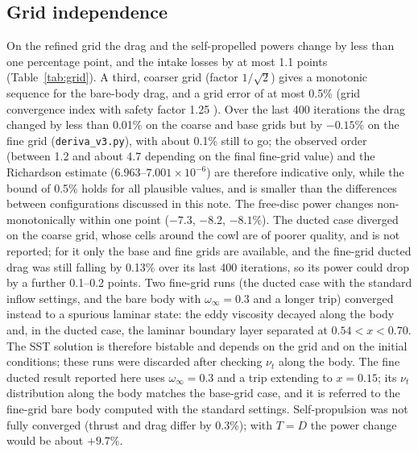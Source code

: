 \documentclass[11pt,a4paper]{article}
\begin{document}
\subsection{Grid independence}\label{sec:grid}
On the refined grid the drag and the self-propelled powers change by less than one
percentage point, and the intake losses by at most 1.1 points (Table~\ref{tab:grid}). A third,
coarser grid (factor $1/\sqrt2$) gives a monotonic sequence for the bare-body drag,
and a grid error of at most 0.5\% (grid convergence index with safety factor 1.25
\cite{celik2008}). Over the last 400 iterations the drag changed by less than
0.01\% on the coarse and base grids but by $-0.15\%$ on the fine grid (\texttt{deriva\_v3.py}),
with about 0.1\% still to go; the observed order (between 1.2 and about 4.7 depending on the
final fine-grid value) and the Richardson estimate ($6.963$--$7.001\times10^{-6}$) are therefore
indicative only, while the bound of 0.5\% holds for all plausible values, and is smaller than
the differences between configurations discussed in this note. The free-disc power changes non-monotonically within one point
($-7.3$, $-8.2$, $-8.1\%$). The ducted case diverged on the coarse grid, whose cells around the
cowl are of poorer quality, and is not reported; for it only the base and fine grids are
available, and the fine-grid ducted drag was still falling by 0.13\% over its last 400
iterations, so its power could drop by a further 0.1--0.2 points. Two fine-grid runs (the ducted case with the standard inflow
settings, and the bare body with $\omega_\infty=0.3$ and a longer trip) converged instead
to a spurious laminar state: the eddy viscosity decayed along the body and, in the ducted
case, the laminar boundary layer separated at $0.54<x<0.70$. The SST solution is therefore
bistable and depends on the grid and on the initial conditions; these runs were discarded
after checking $\nu_t$ along the body. The fine ducted result reported here uses
$\omega_\infty=0.3$ and a trip extending to $x=0.15$; its $\nu_t$ distribution along the
body matches the base-grid case, and it is referred to the fine-grid bare body computed with
the standard settings. Self-propulsion was not fully converged (thrust and drag differ by
0.3\%); with $T=D$ the power change would be about $+9.7\%$.
\end{document}
